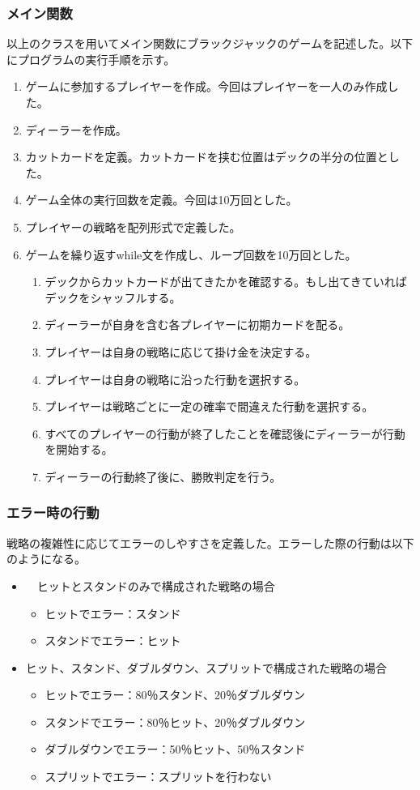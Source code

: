 \subsubsection{メイン関数}
以上のクラスを用いてメイン関数にブラックジャックのゲームを記述した。以下にプログラムの実行手順を示す。
\begin{enumerate}
    \item ゲームに参加するプレイヤーを作成。今回はプレイヤーを一人のみ作成した。
    \item ディーラーを作成。
    \item カットカードを定義。カットカードを挟む位置はデックの半分の位置とした。
    \item ゲーム全体の実行回数を定義。今回は10万回とした。
    \item プレイヤーの戦略を配列形式で定義した。
    \item ゲームを繰り返すwhile文を作成し、ループ回数を10万回とした。
    \begin{enumerate}
        \item デックからカットカードが出てきたかを確認する。もし出てきていればデックをシャッフルする。
	  \item ディーラーが自身を含む各プレイヤーに初期カードを配る。
	  \item プレイヤーは自身の戦略に応じて掛け金を決定する。
	  \item プレイヤーは自身の戦略に沿った行動を選択する。
	  \item プレイヤーは戦略ごとに一定の確率で間違えた行動を選択する。
	  \item すべてのプレイヤーの行動が終了したことを確認後にディーラーが行動を開始する。
	  \item ディーラーの行動終了後に、勝敗判定を行う。
    \end{enumerate}
\end{enumerate}

\subsubsection{エラー時の行動}
戦略の複雑性に応じてエラーのしやすさを定義した。エラーした際の行動は以下のようになる。
\begin{itemize}
    \item　ヒットとスタンドのみで構成された戦略の場合
　　\begin{itemize}
        \item ヒットでエラー：スタンド
        \item スタンドでエラー：ヒット
    \end{itemize}
    \item ヒット、スタンド、ダブルダウン、スプリットで構成された戦略の場合
    \begin{itemize}
        \item ヒットでエラー：80％スタンド、20％ダブルダウン
        \item スタンドでエラー：80％ヒット、20％ダブルダウン
        \item ダブルダウンでエラー：50％ヒット、50％スタンド
        \item スプリットでエラー：スプリットを行わない
    \end{itemize}
\end{itemize}
